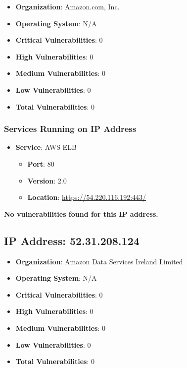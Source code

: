 \documentclass{article}
\begin{document}
\begin{itemize}
    \item \textbf{Organization}: Amazon.com, Inc.
    \item \textbf{Operating System}:  N/A 
    \item \textbf{Critical Vulnerabilities}: 0
    \item \textbf{High Vulnerabilities}: 0
    \item \textbf{Medium Vulnerabilities}: 0
    \item \textbf{Low Vulnerabilities}: 0
    \item \textbf{Total Vulnerabilities}: 0
\end{itemize}

\subsubsection*{Services Running on IP Address}

\begin{itemize}
    
        \item \textbf{Service}: AWS ELB
        \begin{itemize}
            \item \textbf{Port}: 80
            \item \textbf{Version}:  2.0 
            \item \textbf{Location}: \href{ https://54.220.116.192:443/ }{ https://54.220.116.192:443/ }
        \end{itemize}
    
\end{itemize}


\textbf{No vulnerabilities found for this IP address.}




\clearpage



\subsection{IP Address: 52.31.208.124}

\begin{itemize}
    \item \textbf{Organization}: Amazon Data Services Ireland Limited
    \item \textbf{Operating System}:  N/A 
    \item \textbf{Critical Vulnerabilities}: 0
    \item \textbf{High Vulnerabilities}: 0
    \item \textbf{Medium Vulnerabilities}: 0
    \item \textbf{Low Vulnerabilities}: 0
    \item \textbf{Total Vulnerabilities}: 0
\end{itemize}
\end{document}
